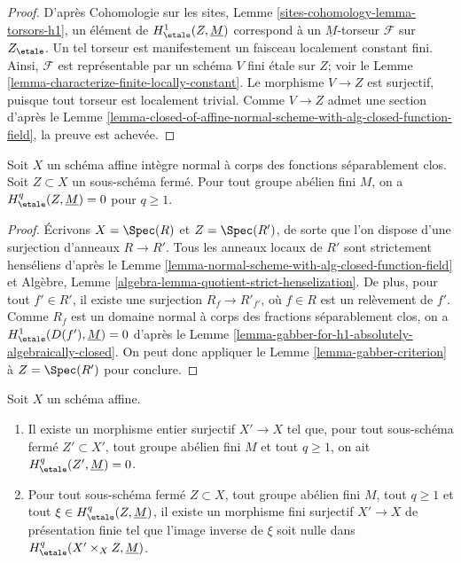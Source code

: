 \begin{proof}
D'après Cohomologie sur les sites, Lemme \ref{sites-cohomology-lemma-torsors-h1},
un élément de $H^1_\etale(Z, \underline{M})$ correspond à un
$\underline{M}$-torseur $\mathcal{F}$ sur $Z_\etale$.
Un tel torseur est manifestement un faisceau localement constant fini.
Ainsi, $\mathcal{F}$ est représentable par un schéma $V$ fini
étale sur $Z$; voir le Lemme \ref{lemma-characterize-finite-locally-constant}.
Le morphisme $V \to Z$ est surjectif, puisque tout torseur est localement trivial.
Comme $V \to Z$ admet une section d'après le
Lemme \ref{lemma-closed-of-affine-normal-scheme-with-alg-closed-function-field},
la preuve est achevée.
\end{proof}

\begin{lemma}
\label{lemma-gabber-for-absolutely-algebraically-closed}
Soit $X$ un schéma affine intègre normal à corps des fonctions
séparablement clos. Soit $Z \subset X$ un sous-schéma fermé.
Pour tout groupe abélien fini $M$, on a
$H^q_\etale(Z, \underline{M}) = 0$ pour $q \geq 1$.
\end{lemma}

\begin{proof}
Écrivons $X = \Spec(R)$ et $Z = \Spec(R')$, de sorte que l'on dispose d'une surjection
d'anneaux $R \to R'$. Tous les anneaux locaux de $R'$ sont strictement henséliens d'après le
Lemme \ref{lemma-normal-scheme-with-alg-closed-function-field} et
Algèbre, Lemme \ref{algebra-lemma-quotient-strict-henselization}.
De plus, pour tout $f' \in R'$, il existe une surjection
$R_f \to R'_{f'}$, où $f \in R$ est un relèvement de $f'$.
Comme $R_f$ est un domaine normal à corps des fractions séparablement clos,
on a $H^1_\etale(D(f'), \underline{M}) = 0$ d'après le
Lemme \ref{lemma-gabber-for-h1-absolutely-algebraically-closed}.
On peut donc appliquer le Lemme \ref{lemma-gabber-criterion} à $Z = \Spec(R')$
pour conclure.
\end{proof}

\begin{lemma}
\label{lemma-integral-cover-trivial-cohomology}
Soit $X$ un schéma affine.
\begin{enumerate}
\item Il existe un morphisme entier surjectif $X' \to X$ tel que, pour
tout sous-schéma fermé $Z' \subset X'$, tout groupe abélien fini $M$ et
tout $q \geq 1$, on ait $H^q_\etale(Z', \underline{M}) = 0$.
\item Pour tout sous-schéma fermé $Z \subset X$, tout groupe abélien fini $M$,
tout $q \geq 1$ et tout $\xi \in H^q_\etale(Z, \underline{M})$, il existe un
morphisme fini surjectif $X' \to X$ de présentation finie tel que
l'image inverse de $\xi$ soit nulle dans $H^q_\etale(X' \times_X Z, \underline{M})$.
\end{enumerate}
\end{lemma}

